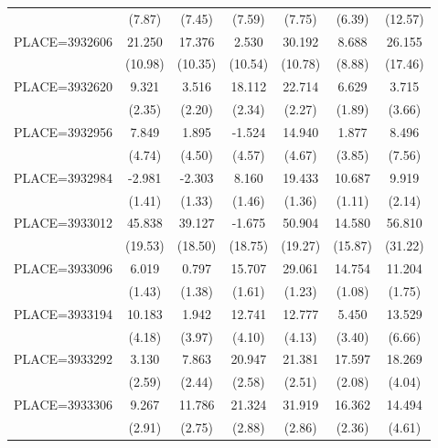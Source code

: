 {\begin{tabular}{l*{6}{c}}
                    &      (7.87)&      (7.45)&      (7.59)&      (7.75)&      (6.39)&     (12.57)\\
PLACE=3932606       &      21.250&      17.376&       2.530&      30.192&       8.688&      26.155\\
                    &     (10.98)&     (10.35)&     (10.54)&     (10.78)&      (8.88)&     (17.46)\\
PLACE=3932620       &       9.321&       3.516&      18.112&      22.714&       6.629&       3.715\\
                    &      (2.35)&      (2.20)&      (2.34)&      (2.27)&      (1.89)&      (3.66)\\
PLACE=3932956       &       7.849&       1.895&      -1.524&      14.940&       1.877&       8.496\\
                    &      (4.74)&      (4.50)&      (4.57)&      (4.67)&      (3.85)&      (7.56)\\
PLACE=3932984       &      -2.981&      -2.303&       8.160&      19.433&      10.687&       9.919\\
                    &      (1.41)&      (1.33)&      (1.46)&      (1.36)&      (1.11)&      (2.14)\\
PLACE=3933012       &      45.838&      39.127&      -1.675&      50.904&      14.580&      56.810\\
                    &     (19.53)&     (18.50)&     (18.75)&     (19.27)&     (15.87)&     (31.22)\\
PLACE=3933096       &       6.019&       0.797&      15.707&      29.061&      14.754&      11.204\\
                    &      (1.43)&      (1.38)&      (1.61)&      (1.23)&      (1.08)&      (1.75)\\
PLACE=3933194       &      10.183&       1.942&      12.741&      12.777&       5.450&      13.529\\
                    &      (4.18)&      (3.97)&      (4.10)&      (4.13)&      (3.40)&      (6.66)\\
PLACE=3933292       &       3.130&       7.863&      20.947&      21.381&      17.597&      18.269\\
                    &      (2.59)&      (2.44)&      (2.58)&      (2.51)&      (2.08)&      (4.04)\\
PLACE=3933306       &       9.267&      11.786&      21.324&      31.919&      16.362&      14.494\\
                    &      (2.91)&      (2.75)&      (2.88)&      (2.86)&      (2.36)&      (4.61)\\

\end{tabular}}

